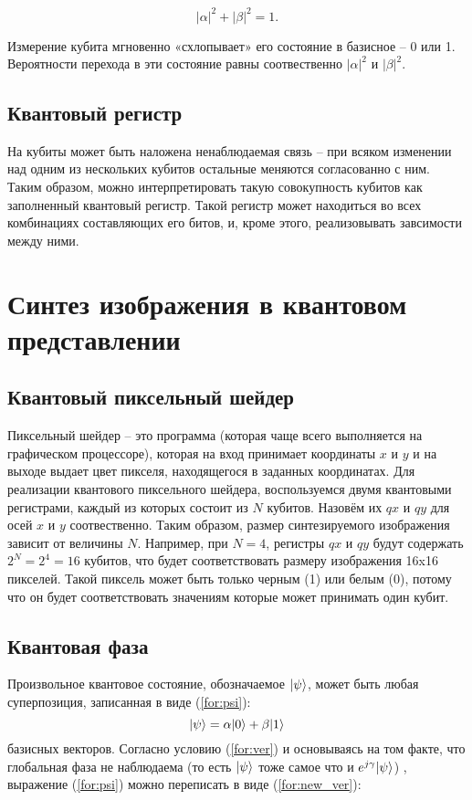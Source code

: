 \begin{equation}
\label{for:ver}
|\alpha|^2 + |\beta|^2 = 1. 
\end{equation} 

Измерение кубита мгновенно «схлопывает»  его состояние в базисное – 0 или 1. Вероятности перехода в эти состояние равны соотвественно $|\alpha|^2$ и $|\beta|^2$. 

\subsection{Квантовый регистр}

На кубиты может быть наложена ненаблюдаемая связь -- при всяком изменении над одним из нескольких кубитов остальные меняются согласованно с ним. Таким образом, можно интерпретировать такую совокупность кубитов как заполненный квантовый регистр. Такой регистр может находиться во всех комбинациях составляющих его битов, и, кроме этого, реализовывать завсимости между ними.

\section{Синтез изображения в квантовом представлении}

\subsection{Квантовый пиксельный шейдер}

Пиксельный шейдер -- это программа (которая чаще всего выполняется на графическом процессоре), которая на вход принимает координаты $x$ и $y$ и на выходе выдает цвет пикселя, находящегося в заданных координатах. Для реализации квантового пиксельного шейдера, воспользуемся двумя квантовыми регистрами, каждый из которых состоит из $N$ кубитов. Назовём их $qx$ и $qy$ для осей $x$ и $y$ соотвественно. Таким образом, размер синтезируемого изображения зависит от величины $N$. Например, при $N = 4$, регистры $qx$ и $qy$ будут содержать $2^N = 2^4 = 16$ кубитов, что будет соответствовать размеру изображения 16x16 пикселей. Такой пиксель может быть только черным (1) или белым (0), потому что он будет соответствовать значениям которые может принимать один кубит. 

\subsection{Квантовая фаза}

Произвольное квантовое состояние, обозначаемое $\lvert\psi\rangle$, может быть любая суперпозиция, записанная в виде (\ref{for:psi}):
\begin{equation}
\label{for:psi}
\lvert\psi\rangle = \alpha\lvert0\rangle + \beta\lvert1\rangle
\end{equation}
 базисных векторов. Согласно условию (\ref{for:ver}) и основываясь на том факте, что глобальная фаза не наблюдаема (то есть $\lvert\psi\rangle$ тоже самое что и $e^{j\gamma}\lvert\psi\rangle$) \cite{global-phase}, выражение (\ref{for:psi}) можно переписать в виде (\ref{for:new_ver}):
 
